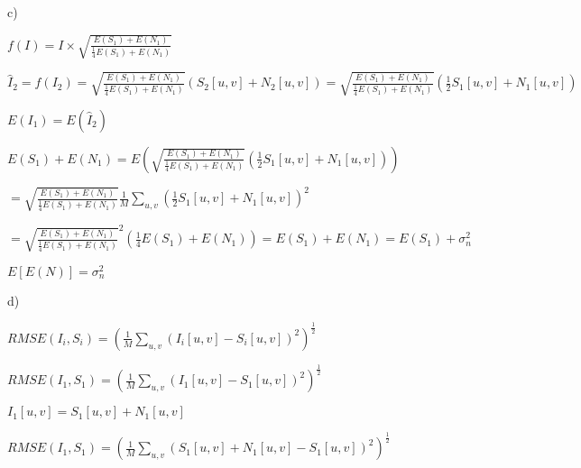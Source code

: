 \documentclass{article}
\begin{document}
c) 

$f\left( I\right) =I\times \sqrt{\frac{E\left( S_{1}\right) +E\left(
N_{1}\right) }{\frac{1}{4}E\left( S_{1}\right) +E\left( N_{1}\right) }}$

$\widehat{I}_{2}=f\left( I_{2}\right) =\sqrt{\frac{E\left( S_{1}\right)
+E\left( N_{1}\right) }{\frac{1}{4}E\left( S_{1}\right) +E\left(
N_{1}\right) }}\left( S_{2}\left[ u,v\right] +N_{2}\left[ u,v\right] \right)
=\sqrt{\frac{E\left( S_{1}\right) +E\left( N_{1}\right) }{\frac{1}{4}E\left(
S_{1}\right) +E\left( N_{1}\right) }}\left( \frac{1}{2}S_{1}\left[ u,v\right]
+N_{1}\left[ u,v\right] \right) $

$E\left( I_{1}\right) =E\left( \widehat{I}_{2}\right) $

$E\left( S_{1}\right) +E\left( N_{1}\right) =E\left( \sqrt{\frac{E\left(
S_{1}\right) +E\left( N_{1}\right) }{\frac{1}{4}E\left( S_{1}\right)
+E\left( N_{1}\right) }}\left( \frac{1}{2}S_{1}\left[ u,v\right] +N_{1}\left[
u,v\right] \right) \right) $

$=\sqrt{\frac{E\left( S_{1}\right) +E\left( N_{1}\right) }{\frac{1}{4}%
E\left( S_{1}\right) +E\left( N_{1}\right) }}\frac{1}{M}\sum_{u,v}\left( 
\frac{1}{2}S_{1}\left[ u,v\right] +N_{1}\left[ u,v\right] \right) ^{2}$

$=\sqrt{\frac{E\left( S_{1}\right) +E\left( N_{1}\right) }{\frac{1}{4}%
E\left( S_{1}\right) +E\left( N_{1}\right) }}^{2}\left( \frac{1}{4}E\left(
S_{1}\right) +E(N_{1})\right) =E\left( S_{1}\right) +E\left( N_{1}\right)
=E\left( S_{1}\right) +\sigma _{n}^{2}$

$E\left[ E\left( N\right) \right] =\sigma _{n}^{2}$


d)

$RMSE\left( I_{i},S_{i}\right) =\left( \frac{1}{M}\sum_{u,v}\left( I_{i}%
\left[ u,v\right] -S_{i}\left[ u,v\right] \right) ^{2}\right) ^{\frac{1}{2}}$

$RMSE\left( I_{1},S_{1}\right) =\left( \frac{1}{M}\sum_{u,v}\left( I_{1}%
\left[ u,v\right] -S_{1}\left[ u,v\right] \right) ^{2}\right) ^{\frac{1}{2}}$

$I_{1}\left[ u,v\right] =S_{1}\left[ u,v\right] +N_{1}\left[ u,v\right] $

$RMSE\left( I_{1},S_{1}\right) =\left( \frac{1}{M}\sum_{u,v}\left( S_{1}%
\left[ u,v\right] +N_{1}\left[ u,v\right] -S_{1}\left[ u,v\right] \right)
^{2}\right) ^{\frac{1}{2}}$
\end{document}
